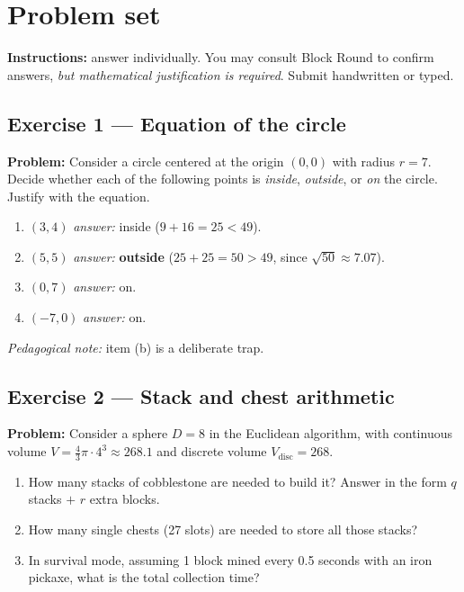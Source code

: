 \documentclass[12pt,a4paper]{scrartcl}
\newcommand{\acc}[1]{\textcolor{accent}{\textbf{#1}}}
\begin{document}
\newpage
\section{Problem set}\label{ap:exerc}

\textbf{Instructions:} answer individually. You may consult Block Round to confirm answers, \emph{but mathematical justification is required}. Submit handwritten or typed.

\subsection*{Exercise 1 --- Equation of the circle}
\textbf{Problem:} Consider a circle centered at the origin $(0, 0)$ with radius $r = 7$. Decide whether each of the following points is \emph{inside}, \emph{outside}, or \emph{on} the circle. Justify with the equation.
\begin{enumerate}[label=\alph*),leftmargin=1.5em,itemsep=0.1em,topsep=0.2em,nosep]
  \item $(3, 4)$ \hfill \emph{answer:} inside ($9 + 16 = 25 < 49$).
  \item $(5, 5)$ \hfill \emph{answer:} \acc{outside} ($25 + 25 = 50 > 49$, since $\sqrt{50} \approx 7.07$).
  \item $(0, 7)$ \hfill \emph{answer:} on.
  \item $(-7, 0)$ \hfill \emph{answer:} on.
\end{enumerate}

\textit{Pedagogical note:} item (b) is a deliberate trap.

\subsection*{Exercise 2 --- Stack and chest arithmetic}
\textbf{Problem:} Consider a sphere $D = 8$ in the Euclidean algorithm, with continuous volume $V = \tfrac{4}{3}\pi \cdot 4^3 \approx 268.1$ and discrete volume $V_{\mathrm{disc}} = 268$.
\begin{enumerate}[label=\alph*),leftmargin=1.5em,itemsep=0.1em,topsep=0.2em,nosep]
  \item How many stacks of cobblestone are needed to build it? Answer in the form $q$ stacks $+$ $r$ extra blocks.
  \item How many single chests (27 slots) are needed to store all those stacks?
  \item In survival mode, assuming 1 block mined every 0.5 seconds with an iron pickaxe, what is the total collection time?
\end{enumerate}
\end{document}
